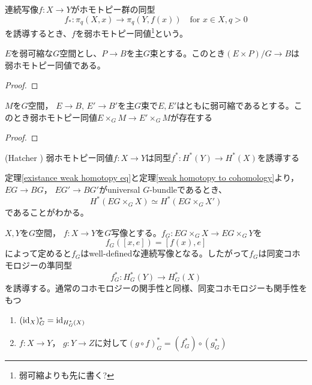 連続写像$f\colon X\rightarrow Y$がホモトピー群の同型
\[
f_*\colon\pi_q(X, x)\rightarrow \pi_q(Y, f(x))\quad\text{for } x\in X, q>0 
\]
を誘導するとき、$f$を弱ホモトピー同値\footnote{弱可縮よりも先に書く?}という。

\begin{lemm}
  $E$を弱可縮な$G$空間とし、$P\rightarrow B$を主$G$束とする。このとき$(E\times P)/G\rightarrow B$は弱ホモトピー同値である。
\end{lemm}

\begin{proof}
  
\end{proof}

\begin{theo}\label{existance weak homotopy eq}
  $M$を$G$空間， $E\rightarrow B$, $E'\rightarrow B'$を主$G$束で$E,E'$はともに弱可縮であるとする。このとき弱ホモトピー同値$E\times_GM\rightarrow E'\times_GM$が存在する
\end{theo}

\begin{proof}
  
\end{proof}

\begin{theo}(Hatcher \cite{hatcher Top})\label{weak homotopy to cohomology}
  弱ホモトピー同値$f\colon X\rightarrow Y$は同型$f^*\colon H^*(Y)\rightarrow H^*(X)$を誘導する
\end{theo}

定理\ref{existance weak homotopy eq}と定理\ref{weak homotopy to cohomology}より， $EG\rightarrow BG$， $EG'\rightarrow BG'$がuniversal $G$-bundleであるとき、
\[
H^*(EG\times_GX)\simeq H^*(EG\times_GX')
\]
であることがわかる。

$X, Y$を$G$空間， $f\colon X\rightarrow Y$を$G$写像とする。$f_G\colon EG\times_GX\rightarrow EG\times_GY$を
\[
f_G([x, e])=[f(x), e]
\]
によって定めると$f_G$はwell-definedな連続写像となる。したがって$f_G$は同変コホモロジーの準同型
\[
f_G^*\colon H^*_G(Y)\rightarrow H^*_G(X)
\]
を誘導する。通常のコホモロジーの関手性と同様、同変コホモロジーも関手性をもつ
\begin{prop}\:
  \begin{enumerate}
    \item $(\text{id}_{X})_G^*=\text{id}_{H^*_G(X)}$
    \item $f\colon X\rightarrow Y$， $g\colon Y\rightarrow Z$に対して$(g\circ f)_G^*=(f_G^*)\circ(g_G^*)$
  \end{enumerate}
\end{prop}

